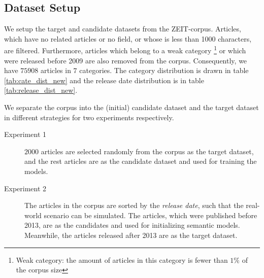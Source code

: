 \bigbreak

\subsection{Dataset Setup}
\label{sec:4.5}

We setup the target and candidate datasets from the ZEIT-corpus. Articles, which have no related articles or no \ititle{} field, or whose \icontent{} is less than 1000 characters, are filtered. Furthermore, articles which belong to a weak category \footnote{Weak category: the amount of articles in this category is fewer than $1\%$ of the corpus size} or which were released before 2009 are also removed from the corpus. Consequently, we have $75908$ articles in $7$ categories. The category distribution is drawn in table \ref{tab:cate_dist_new} and the release date distribution is in table \ref{tab:release_dist_new}. 

We separate the corpus into the (initial) candidate dataset and the target dataset in different strategies for two experiments respectively. 

\begin{description}
\item[Experiment 1] $2000$ articles are selected randomly from the corpus as the target dataset, and the rest articles are as the candidate dataset and used for training the models. 
\item[Experiment 2] The articles in the corpus are sorted by the \textit{release date}, such that the real-world scenario can be simulated. The articles, which were published before 2013, are as the candidates and used for initializing semantic models. Meanwhile, the articles released after 2013 are as the target dataset.

\end{description}


